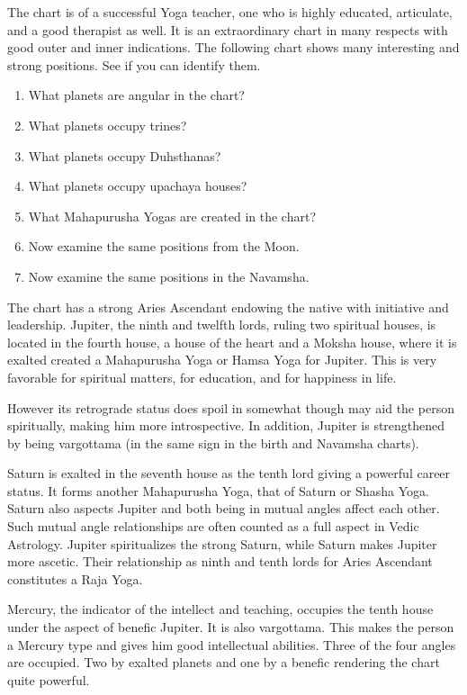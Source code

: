 The chart is of a successful Yoga teacher, one who is highly educated, articulate, and a good therapist as well. It is an extraordinary chart in many respects with good outer and inner indications. The following chart shows many interesting and strong positions. See if you can identify them.

 
\begin{enumerate}
\item What planets are angular in the chart?
\item What planets occupy trines?
\item What planets occupy Duhsthanas?
\item What planets occupy upachaya houses?
\item What Mahapurusha Yogas are created in the chart?
\item Now examine the same positions from the Moon.
\item Now examine the same positions in the Navamsha.
\end{enumerate}

The chart has a strong Aries Ascendant endowing the native with initiative and leadership. Jupiter, the ninth and twelfth lords, ruling two spiritual houses, is located in the fourth house, a house of the heart and a Moksha house, where it is exalted created a Mahapurusha Yoga or Hamsa Yoga for Jupiter. This is very favorable for spiritual matters, for education, and for happiness in life.

 

However its retrograde status does spoil in somewhat though may aid the person spiritually, making him more introspective. In addition, Jupiter is strengthened by being vargottama (in the same sign in the birth and Navamsha charts).

 

 

Saturn is exalted in the seventh house as the tenth lord giving a powerful career status. It forms another Mahapurusha Yoga, that of Saturn or Shasha Yoga. Saturn also aspects Jupiter and both being in mutual angles affect each other. Such mutual angle relationships are often counted as a full aspect in Vedic Astrology. Jupiter spiritualizes the strong Saturn, while Saturn makes Jupiter more ascetic. Their relationship as ninth and tenth lords for Aries Ascendant constitutes a Raja Yoga.

 

Mercury, the indicator of the intellect and teaching, occupies the tenth house under the aspect of benefic Jupiter. It is also vargottama. This makes the person a Mercury type and gives him good intellectual abilities. Three of the four angles are occupied. Two by exalted planets and one by a benefic rendering the chart quite powerful.


